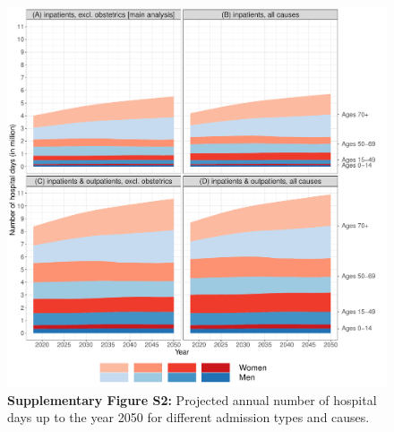 

\newpage


	\begin{figure}[H]
		\centering
		\includegraphics[scale=0.45]{Paper_4/Supplementary_Figure_S2.pdf}
		\caption*{	\textbf{Supplementary Figure S2:} Projected annual number of hospital 
					days up to the year 2050 for different admission types and causes.}
	\label{ch5:figS2}
	\end{figure}





